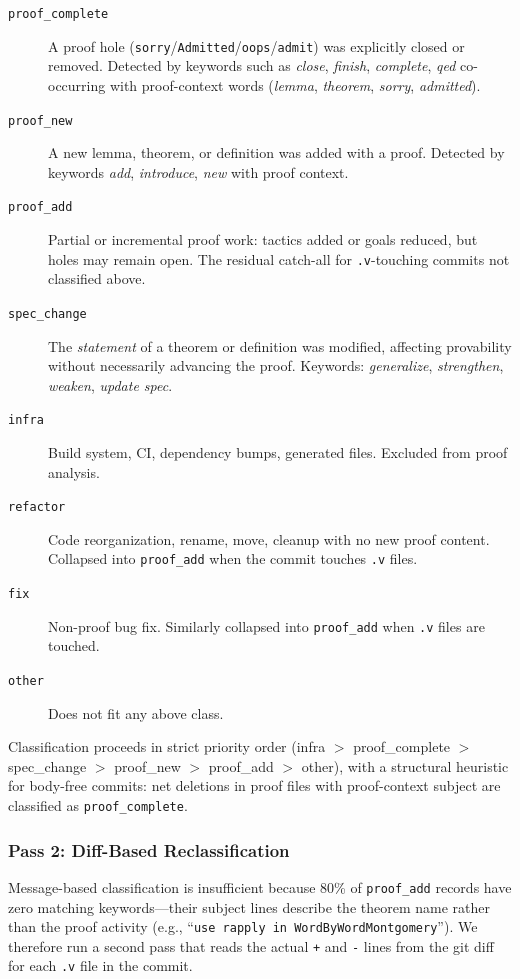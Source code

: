 \documentclass[11pt]{article}
\begin{document}
\begin{description}
  \item[\texttt{proof\_complete}] A proof hole (\texttt{sorry}/\texttt{Admitted}/\texttt{oops}/\texttt{admit}) was explicitly closed or removed. Detected by keywords such as \textit{close}, \textit{finish}, \textit{complete}, \textit{qed} co-occurring with proof-context words (\textit{lemma}, \textit{theorem}, \textit{sorry}, \textit{admitted}).
  \item[\texttt{proof\_new}] A new lemma, theorem, or definition was added with a proof. Detected by keywords \textit{add}, \textit{introduce}, \textit{new} with proof context.
  \item[\texttt{proof\_add}] Partial or incremental proof work: tactics added or goals reduced, but holes may remain open. The residual catch-all for \texttt{.v}-touching commits not classified above.
  \item[\texttt{spec\_change}] The \textit{statement} of a theorem or definition was modified, affecting provability without necessarily advancing the proof. Keywords: \textit{generalize}, \textit{strengthen}, \textit{weaken}, \textit{update spec}.
  \item[\texttt{infra}] Build system, CI, dependency bumps, generated files. Excluded from proof analysis.
  \item[\texttt{refactor}] Code reorganization, rename, move, cleanup with no new proof content. Collapsed into \texttt{proof\_add} when the commit touches \texttt{.v} files.
  \item[\texttt{fix}] Non-proof bug fix. Similarly collapsed into \texttt{proof\_add} when \texttt{.v} files are touched.
  \item[\texttt{other}] Does not fit any above class.
\end{description}

Classification proceeds in strict priority order (infra $>$ proof\_complete $>$ spec\_change $>$ proof\_new $>$ proof\_add $>$ other), with a structural heuristic for body-free commits: net deletions in proof files with proof-context subject are classified as \texttt{proof\_complete}.

\subsubsection{Pass 2: Diff-Based Reclassification}

Message-based classification is insufficient because 80\% of \texttt{proof\_add} records have zero matching keywords---their subject lines describe the theorem name rather than the proof activity (e.g., ``\texttt{use rapply in WordByWordMontgomery}''). We therefore run a second pass that reads the actual \texttt{+} and \texttt{-} lines from the git diff for each \texttt{.v} file in the commit.
\end{document}
